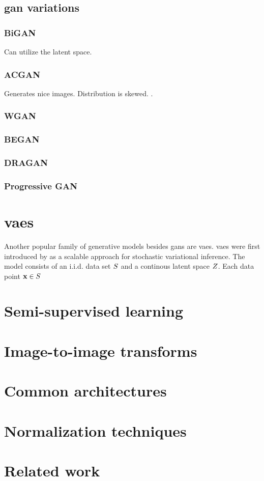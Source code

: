 \subsection{\acrshort{gan} variations}
\subsubsection{BiGAN}
Can utilize the latent space.
\subsubsection{ACGAN}
Generates nice images. \textcite{odena2016conditional} Distribution is skewed. \textcite{shuac2017acganisbad}.
\subsubsection{WGAN}
\subsubsection{BEGAN}
\subsubsection{DRAGAN}
\subsubsection{Progressive GAN}

\section{\acrlong{vaes}}
Another popular family of generative models besides \acrshort{gans} are \acrfull{vaes}. \acrlong{vaes} were first introduced by \textcite{kingma2013auto} as a scalable approach for stochastic variational inference. The model consists of an i.i.d. data set $S$ and a continous latent space $Z$. Each data point $\mathbf{x} \in S$ 

\section{Semi-supervised learning}

\section{Image-to-image transforms}

\section{Common architectures}

\section{Normalization techniques}

\section{Related work}




